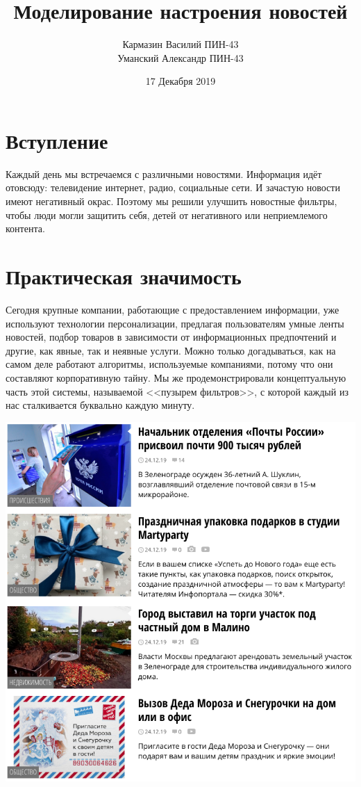 \documentclass[12pt]{article}
\title{\textbf{Моделирование настроения новостей}}
\date{17 Декабря 2019}
\author{Кармазин Василий ПИН-43\\ Уманский Александр ПИН-43}
\begin{document}
    \maketitle

    \section{Вступление}
        Каждый день мы встречаемся с различными новостями. Информация идёт отовсюду: телевидение
        интернет, радио, социальные сети. И зачастую новости имеют негативный окрас.
        Поэтому мы решили улучшить новостные фильтры, чтобы люди могли защитить себя,
        детей от негативного или неприемлемого контента.

    \section{Практическая значимость}
        Сегодня крупные компании, работающие с предоставлением информации, уже используют технологии персонализации, предлагая пользователям 
        умные ленты новостей, подбор товаров в зависимости от информационных предпочтений и другие, как явные, так и неявные услуги.
        Можно только догадываться, как на самом деле работают алгоритмы, используемые компаниями, потому что они составляют корпоративную тайну. 
        Мы же продемонстрировали концептуальную часть этой системы, называемой <<пузырем фильтров>>, с которой каждый из нас сталкивается буквально каждую минуту.
        
        \begin{center}
            \includegraphics[scale=0.7]{examples}
        \end{center}
\end{document}
